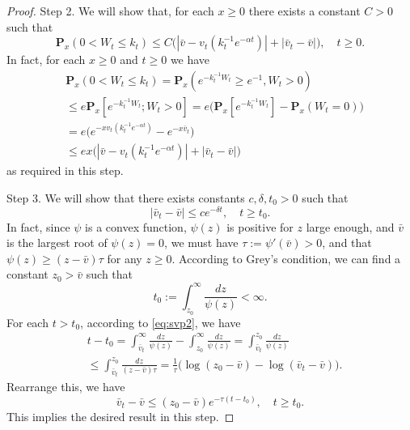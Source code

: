 \documentclass[12pt,a4paper]{amsart}
\theoremstyle{plain}
\theoremstyle{definition}
\numberwithin{equation}{section}
\begin{document}
\begin{proof}
    Step 2. We will show that, for each $x \geq 0$ there exists a constant $C>0$ such that
\[
    \mathbf P_{x}(0< W_t\leq k_t)
    \leq C\big(|\bar v- v_t(k_t^{-1}e^{-\alpha t})|+|\bar v_t - \bar v|\big),
    \quad t\geq 0.
\]
In fact, for each $x\geq 0$ and $t\geq 0$ we have
\begin{equation}\begin{split}
    &\mathbf P_{x}(0<W_t \leq k_t)
    = \mathbf P_{x}( e^{-k_t^{-1}W_t}\geq e^{-1},W_t > 0)
    \\&\leq e \mathbf P_{x}[e^{-k_t^{-1} W_t};W_t > 0]
    =  e\big(\mathbf P_x[e^{-k_t^{-1} W_t}]-\mathbf P_x(W_t = 0)\big)
    \\ &= e\big(e^{-xv_t(k_t^{-1} e^{-\alpha t})}-e^{-x\bar v_t}\big)
    \\&\leq ex \big(|\bar v-v_t(k_t^{-1} e^{-\alpha t})|+ |\bar v_t- \bar v|\big)
\end{split}\end{equation}
    as required in this step.

    Step 3. We will show that there exists constants $c, \delta, t_0 > 0$ such that
\[
    |\bar v_t-\bar v|
    \leq ce^{-\delta t},
    \quad t\geq t_0.
\]
    In fact, since $\psi$ is a convex function, $\psi(z)$ is positive for $z$ large enough, and $\bar v$ is the largest root of $\psi(z)=0$, we must have $\tau:=\psi'(\bar v)>0$, and that  $\psi(z) \geq (z-\bar v)\tau$ for any $z\geq 0$.
    According to Grey's condition, we can find a constant $z_0 >\bar v $ such that
\[
    t_0
    := \int^\infty_{z_0} \frac{dz}{\psi(z)} < \infty.
\]
    For each $t > t_0$, according to \eqref{eq:svp2}, we have
\begin{equation}\begin{split}
    &t-t_0 = \int^\infty_{\bar v_t} \frac{dz}{\psi(z)} - \int_{z_0}^\infty \frac{dz}{\psi(z)}
    =\int_{\bar v_t}^{z_0} \frac{dz}{\psi(z)}
    \\ &\leq \int_{\bar v_t}^{z_0} \frac{dz}{(z-\bar v)\tau}
    = \frac{1}{\tau} \big(\log (z_0-\bar v) - \log(\bar v_t-\bar v)\big).
\end{split}\end{equation}
    Rearrange this, we have
\[
    \bar v_t - \bar v \leq (z_0 - \bar v)e^{-\tau(t-t_0)},
    \quad t\geq t_0.
\]
    This implies the desired result in this step.


\end{proof}
\end{document}
